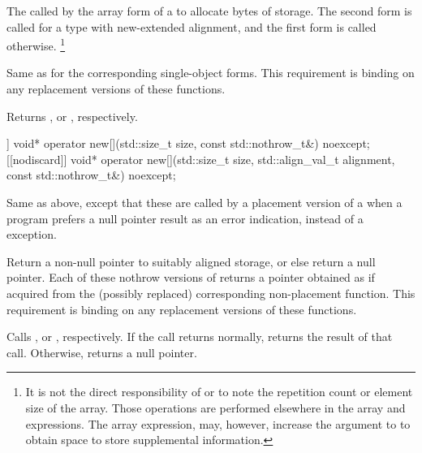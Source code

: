 \begin{itemdescr}
\pnum
\effects
The
called by the array form of a
to allocate
 bytes of storage.
The second form is called for a type with new-extended alignment, and
the first form is called otherwise.%
\footnote{It is not the direct responsibility of
or
to note the repetition count or element size of the array.
Those operations are performed elsewhere in the array
and
expressions.
The array
expression, may, however, increase the  argument to
to obtain space to store supplemental information.}

\pnum
\replaceable
{}

\pnum
\required
Same as for
the corresponding single-object forms.
This requirement is binding on any replacement versions of these functions.

\pnum
{}
Returns
,
or
,
respectively.
\end{itemdescr}

%
\begin{itemdecl}
[[nodiscard]] void* operator new[](std::size_t size, const std::nothrow_t&) noexcept;
[[nodiscard]] void* operator new[](std::size_t size, std::align_val_t alignment,
                                   const std::nothrow_t&) noexcept;
\end{itemdecl}

\begin{itemdescr}
\pnum
\effects
Same as above, except that these are called by a placement version of a
when a \Cpp{} program prefers a null pointer result as an error indication,
instead of a
exception.

\pnum
\replaceable
{}

\pnum
\required
Return a non-null pointer to suitably aligned storage,
or else return a null pointer.
Each of these nothrow versions of
returns a pointer obtained as if
acquired from the (possibly replaced)
corresponding non-placement function.
This requirement is binding on any replacement versions of these functions.

\pnum
{}
Calls ,
or ,
respectively.
If the call returns normally,
returns the result of that call.
Otherwise, returns a null pointer.
\end{itemdescr}

